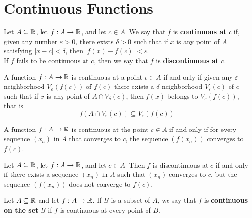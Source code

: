 \section{Continuous Functions}

\begin{definition}
	Let $A \subseteq \mathbb{R}$, let $f:A \rightarrow \mathbb{R}$, and let $c \in A$. We say that $f$ is \textbf{continuous at} $c$ if, given any number $\varepsilon > 0$, there exists $\delta > 0$ such that if $x$ is any point of $A$ satisfying $|x-c|<\delta$, then $|f(x)-f(c)|<\varepsilon$.
	\\If $f$ fails to be continuous at $c$, then we say that $f$ is \textbf{discontinuous at} $c$.
\end{definition}

\begin{theorem}
	A function $f:A \rightarrow \mathbb{R}$ is continuous at a point $c \in A$ if and only if given any $\varepsilon$-neighborhood $V_\varepsilon (f(c))$ of $f(c)$ there exists a $\delta$-neighborhood $V_\varepsilon(c)$ of $c$ such that if $x$ is any point of $A \cap V_\delta(c)$, then $f(x)$ belongs to $V_\varepsilon (f(c))$, that is
	\[f(A \cap V_\varepsilon (c)) \subseteq V_\varepsilon (f(c))\]
\end{theorem}

\begin{theorem}
	A function $f:A \rightarrow \mathbb{R}$ is continuous at the point $c \in A$ if and only if for every sequence $(x_n)$ in $A$ that converges to $c$, the sequence $(f(x_n))$ converges to $f(c)$.
\end{theorem}

\begin{theorem}
	Let $A \subseteq \mathbb{R}$, let $f:A \rightarrow \mathbb{R}$, and let $c \in A$. Then $f$ is discontinuous at $c$ if and only if there exists a sequence $(x_n)$ in $A$ such that $(x_n)$ converges to $c$, but the sequence $(f(x_n))$ does not converge to $f(c)$.
\end{theorem}

\begin{definition}
	Let $A \subseteq \mathbb{R}$ and let $f: A \rightarrow \mathbb{R}$. If $B$ is a subset of $A$, we say that $f$ is \textbf{continuous on the set} $B$ if $f$ is continuous at every point of $B$.
\end{definition}
